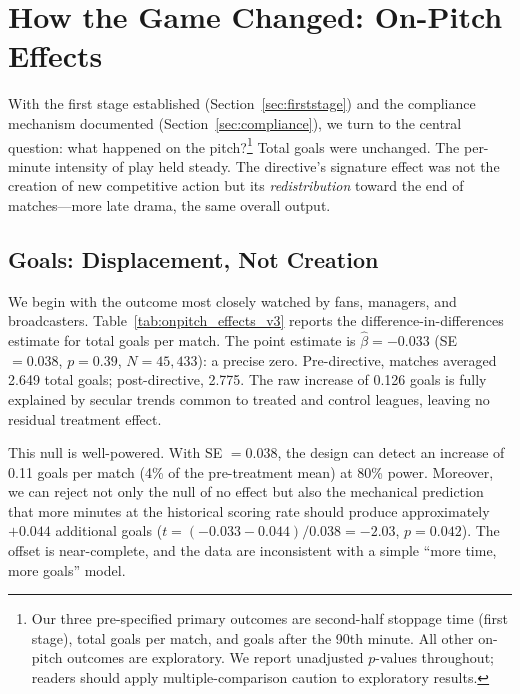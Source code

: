 \section{How the Game Changed: On-Pitch Effects}
\label{sec:onpitch}

With the first stage established (Section~\ref{sec:firststage}) and the compliance mechanism documented (Section~\ref{sec:compliance}), we turn to the central question: what happened on the pitch?\footnote{Our three pre-specified primary outcomes are second-half stoppage time (first stage), total goals per match, and goals after the 90th minute. All other on-pitch outcomes are exploratory. We report unadjusted $p$-values throughout; readers should apply multiple-comparison caution to exploratory results.} Total goals were unchanged. The per-minute intensity of play held steady. The directive's signature effect was not the creation of new competitive action but its \emph{redistribution} toward the end of matches---more late drama, the same overall output.


\subsection{Goals: Displacement, Not Creation}
\label{subsec:goals}

We begin with the outcome most closely watched by fans, managers, and broadcasters. Table~\ref{tab:onpitch_effects_v3} reports the difference-in-differences estimate for total goals per match. The point estimate is $\hat{\beta} = -0.033$ (SE $= 0.038$, $p = 0.39$, $N = 45{,}433$): a precise zero. Pre-directive, matches averaged 2.649 total goals; post-directive, 2.775. The raw increase of 0.126 goals is fully explained by secular trends common to treated and control leagues, leaving no residual treatment effect.

This null is well-powered. With SE $= 0.038$, the design can detect an increase
of 0.11 goals per match (4\% of the pre-treatment mean) at 80\% power. Moreover,
we can reject not only the null of no effect but also the mechanical prediction
that more minutes at the historical scoring rate should produce approximately
$+0.044$ additional goals ($t = (-0.033 - 0.044)/0.038 = -2.03$, $p = 0.042$).
The offset is near-complete, and the data are inconsistent with a simple ``more
time, more goals'' model.


